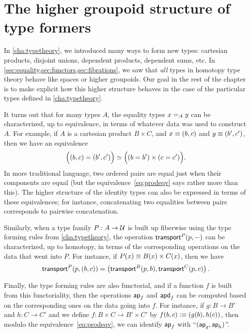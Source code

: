 \section{The higher groupoid structure of type formers}
\label{sec:computational}

In \autoref{cha:typetheory}, we introduced many ways to form new types: cartesian products, disjoint unions, dependent products, dependent sums, etc.
In \autoref{sec:equality,sec:functors,sec:fibrations}, we saw that \emph{all} types in homotopy type theory behave like spaces or higher groupoids.
Our goal in the rest of the chapter is to make explicit how this higher structure behaves in the case of the particular types defined in \autoref{cha:typetheory}.

It turns out that for many types $A$, the equality types $\id[A]xy$ can be characterized, up to equivalence, in terms of whatever data was used to construct $A$.
For example, if $A$ is a cartesian product $B\times C$, and $x\jdeq (b,c)$ and $y\jdeq(b',c')$, then we have an equivalence
\begin{equation}\label{eq:prodeqv}
  \eqv{\Big((b,c)=(b',c')\Big)}{\Big((b=b')\times (c=c')\Big)}.
\end{equation}
In more traditional language, two ordered pairs are equal just when their components are equal (but the equivalence~\eqref{eq:prodeqv} says rather more than this).
The higher structure of the identity types can also be expressed in terms of these equivalences; for instance, concatenating two equalities between pairs corresponds to pairwise concatenation.

Similarly, when a type family $P:A\to\type$ is built up fiberwise using the type forming rules from \autoref{cha:typetheory}, the operation $\transfib{P}{p}{-}$ can be characterized, up to homotopy, in terms of the corresponding operations on the data that went into $P$.
For instance, if $P(x) \jdeq B(x)\times C(x)$, then we have
\[\transfib{P}{p}{(b,c)} = \left(\transfib{B}{p}{b},\transfib{C}{p}{c}\right).\]

Finally, the type forming rules are also functorial, and if a function $f$ is built from this functoriality, then the operations $\apfunc f$ and $\apdfunc f$ can be computed based on the corresponding ones on the data going into $f$.
For instance, if $g:B\to B'$ and $h:C\to C'$ and we define $f:B\times C \to B'\times C'$ by $f(b,c)\defeq (g(b),h(c))$, then modulo the equivalence~\eqref{eq:prodeqv}, we can identify $\apfunc f$ with ``$(\apfunc g,\apfunc h)$''.

